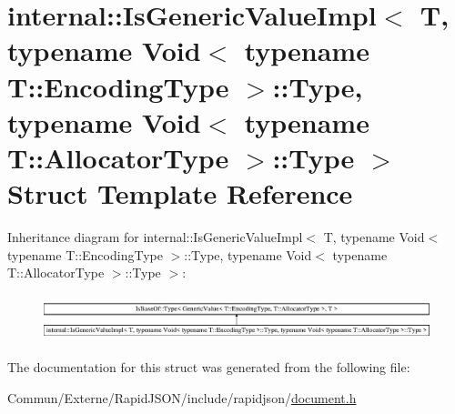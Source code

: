 \hypertarget{structinternal_1_1_is_generic_value_impl_3_01_t_00_01typename_01_void_3_01typename_01_t_1_1_enco3a51e9d8b4986f001b39e1e8edecb66a}{}\section{internal\+:\+:Is\+Generic\+Value\+Impl$<$ T, typename Void$<$ typename T\+:\+:Encoding\+Type $>$\+:\+:Type, typename Void$<$ typename T\+:\+:Allocator\+Type $>$\+:\+:Type $>$ Struct Template Reference}
\label{structinternal_1_1_is_generic_value_impl_3_01_t_00_01typename_01_void_3_01typename_01_t_1_1_enco3a51e9d8b4986f001b39e1e8edecb66a}
Inheritance diagram for internal\+:\+:Is\+Generic\+Value\+Impl$<$ T, typename Void$<$ typename T\+:\+:Encoding\+Type $>$\+:\+:Type, typename Void$<$ typename T\+:\+:Allocator\+Type $>$\+:\+:Type $>$\+:\begin{figure}[H]
\begin{center}
\leavevmode
\includegraphics[height=1.372549cm]{structinternal_1_1_is_generic_value_impl_3_01_t_00_01typename_01_void_3_01typename_01_t_1_1_enco3a51e9d8b4986f001b39e1e8edecb66a}
\end{center}
\end{figure}


The documentation for this struct was generated from the following file\+:\begin{DoxyCompactItemize}
\item 
Commun/\+Externe/\+Rapid\+J\+S\+O\+N/include/rapidjson/\hyperlink{document_8h}{document.\+h}\end{DoxyCompactItemize}
